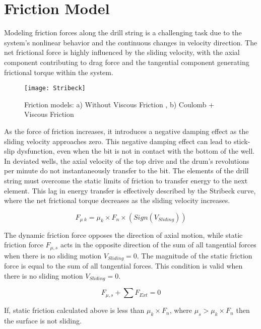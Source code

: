\section{Friction Model}

Modeling friction forces along the drill string is a challenging task due to the system's nonlinear behavior and the continuous changes in velocity direction. The net frictional force is highly influenced by the sliding velocity, with the axial component contributing to drag force and the tangential component generating frictional torque within the system.
 
\begin{figure}
  \centering
  \texttt{[image: Stribeck]}
  \caption{Friction models: a) Without Viscous Friction , b) Coulomb + Viscous Friction}\label{Friction models}
\end{figure}

As the force of friction increases, it introduces a negative damping effect as the sliding velocity approaches zero. This negative damping effect can lead to stick-slip dysfunction, even when the bit is not in contact with the bottom of the well. In deviated wells, the axial velocity of the top drive and the drum's revolutions per minute do not instantaneously transfer to the bit. The elements of the drill string must overcome the static limits of friction to transfer energy to the next element. This lag in energy transfer is effectively described by the Stribeck curve, where the net frictional torque decreases as the sliding velocity increases.

\begin{equation}\label{dyanmic_force}
  F_{\mu\; k} = \mu_{k}\times F_{n} \times (Sign(V_{Sliding}))
\end{equation}

The dynamic friction force opposes the direction of axial motion, while static friction force $F_{\mu,s}$ acts in the opposite direction of the sum of all tangential forces when there is no sliding motion $V_{Sliding}=0$. The magnitude of the static friction force is equal to the sum of all tangential forces. This condition is valid when there is no sliding motion $V_{Sliding}=0$.

\begin{equation}\label{zero}
  F_{\mu,s} + \sum F_{Ext} = 0
\end{equation}

If, static friction calculated above is less than $\mu_{k}\times F_{n}$, where $\mu_{s} > \mu_{k}\times F_{n}$ then the surface is not sliding.

